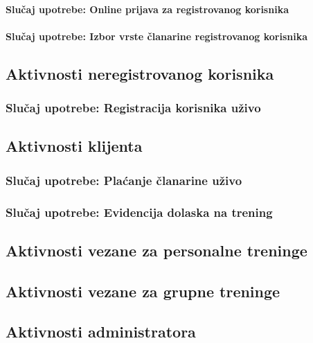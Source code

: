 \documentclass[a4paper]{article}
\begin{document}
\paragraph{Slučaj upotrebe: Online prijava za registrovanog korisnika}

\paragraph{Slučaj upotrebe: Izbor vrste članarine registrovanog korisnika}



\subsection{Aktivnosti neregistrovanog korisnika}
\subsubsection{Slučaj upotrebe: Registracija korisnika uživo}


\subsection{Aktivnosti klijenta}
\subsubsection{Slučaj upotrebe: Plaćanje članarine uživo}


\subsubsection{Slučaj upotrebe: Evidencija dolaska na trening}


\newpage
\subsection{Aktivnosti vezane za personalne treninge}


\newpage
\subsection{Aktivnosti vezane za grupne treninge}

\newpage
\subsection{Aktivnosti administratora}
\end{document}
